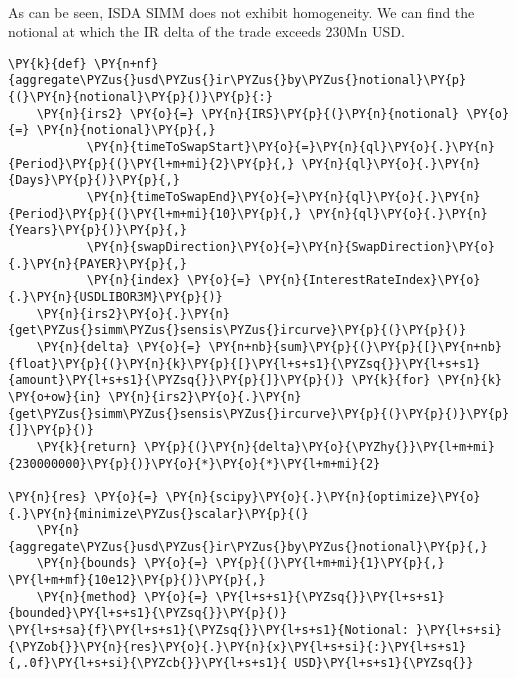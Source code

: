             
            \begin{tcolorbox}[breakable, size=fbox, boxrule=.5pt, pad at break*=1mm, opacityfill=0]
    \begin{center}
    \end{center}
    { \hspace*{\fill} \\}
\end{tcolorbox}
    

    As can be seen, ISDA SIMM does not exhibit homogeneity. We can find the
notional at which the IR delta of the trade exceeds 230Mn USD.

    \begin{tcolorbox}[breakable, size=fbox, boxrule=1pt, pad at break*=1mm,colback=cellbackground, colframe=cellborder]
\begin{Verbatim}[commandchars=\\\{\}]
\PY{k}{def} \PY{n+nf}{aggregate\PYZus{}usd\PYZus{}ir\PYZus{}by\PYZus{}notional}\PY{p}{(}\PY{n}{notional}\PY{p}{)}\PY{p}{:}
    \PY{n}{irs2} \PY{o}{=} \PY{n}{IRS}\PY{p}{(}\PY{n}{notional} \PY{o}{=} \PY{n}{notional}\PY{p}{,}
           \PY{n}{timeToSwapStart}\PY{o}{=}\PY{n}{ql}\PY{o}{.}\PY{n}{Period}\PY{p}{(}\PY{l+m+mi}{2}\PY{p}{,} \PY{n}{ql}\PY{o}{.}\PY{n}{Days}\PY{p}{)}\PY{p}{,}
           \PY{n}{timeToSwapEnd}\PY{o}{=}\PY{n}{ql}\PY{o}{.}\PY{n}{Period}\PY{p}{(}\PY{l+m+mi}{10}\PY{p}{,} \PY{n}{ql}\PY{o}{.}\PY{n}{Years}\PY{p}{)}\PY{p}{,}
           \PY{n}{swapDirection}\PY{o}{=}\PY{n}{SwapDirection}\PY{o}{.}\PY{n}{PAYER}\PY{p}{,}
           \PY{n}{index} \PY{o}{=} \PY{n}{InterestRateIndex}\PY{o}{.}\PY{n}{USDLIBOR3M}\PY{p}{)}
    \PY{n}{irs2}\PY{o}{.}\PY{n}{get\PYZus{}simm\PYZus{}sensis\PYZus{}ircurve}\PY{p}{(}\PY{p}{)}
    \PY{n}{delta} \PY{o}{=} \PY{n+nb}{sum}\PY{p}{(}\PY{p}{[}\PY{n+nb}{float}\PY{p}{(}\PY{n}{k}\PY{p}{[}\PY{l+s+s1}{\PYZsq{}}\PY{l+s+s1}{amount}\PY{l+s+s1}{\PYZsq{}}\PY{p}{]}\PY{p}{)} \PY{k}{for} \PY{n}{k} \PY{o+ow}{in} \PY{n}{irs2}\PY{o}{.}\PY{n}{get\PYZus{}simm\PYZus{}sensis\PYZus{}ircurve}\PY{p}{(}\PY{p}{)}\PY{p}{]}\PY{p}{)}
    \PY{k}{return} \PY{p}{(}\PY{n}{delta}\PY{o}{\PYZhy{}}\PY{l+m+mi}{230000000}\PY{p}{)}\PY{o}{*}\PY{o}{*}\PY{l+m+mi}{2}

\PY{n}{res} \PY{o}{=} \PY{n}{scipy}\PY{o}{.}\PY{n}{optimize}\PY{o}{.}\PY{n}{minimize\PYZus{}scalar}\PY{p}{(}
    \PY{n}{aggregate\PYZus{}usd\PYZus{}ir\PYZus{}by\PYZus{}notional}\PY{p}{,}
    \PY{n}{bounds} \PY{o}{=} \PY{p}{(}\PY{l+m+mi}{1}\PY{p}{,} \PY{l+m+mf}{10e12}\PY{p}{)}\PY{p}{,}
    \PY{n}{method} \PY{o}{=} \PY{l+s+s1}{\PYZsq{}}\PY{l+s+s1}{bounded}\PY{l+s+s1}{\PYZsq{}}\PY{p}{)}
\PY{l+s+sa}{f}\PY{l+s+s1}{\PYZsq{}}\PY{l+s+s1}{Notional: }\PY{l+s+si}{\PYZob{}}\PY{n}{res}\PY{o}{.}\PY{n}{x}\PY{l+s+si}{:}\PY{l+s+s1}{,.0f}\PY{l+s+si}{\PYZcb{}}\PY{l+s+s1}{ USD}\PY{l+s+s1}{\PYZsq{}}
\end{Verbatim}
\end{tcolorbox}

